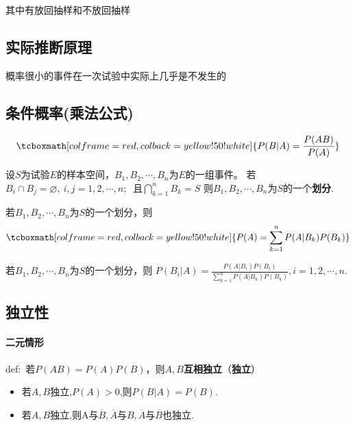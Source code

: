 \documentclass[UTF8]{ctexart}
\newcommand\stressbox{\tcboxmath[colframe=red,colback=yellow!50!white]}
\newenvironment{itemizeg}{\begin{itemize}}{\end{itemize}}
\begin{document}
其中有放回抽样和不放回抽样

\subsection{实际推断原理}

概率很小的事件在一次试验中实际上几乎是不发生的

\subsection{条件概率(乘法公式)}
$$\stressbox{\displaystyle P(B|A)=\frac{P(AB)}{P(A)}}$$

\begin{tcolorbox}[colframe=blue,title=\subsection{全概率公式}]
    \begin{tcolorbox}[colframe=white!60!black,title=\large 划分]
        设$S$为试验$E$的样本空间，$B_1,B_2,\cdots,B_n$为$E$的一组事件。
若$B_i\cap B_j=\varnothing,\ i,j=1,2,\cdots,n;\ $
且$\bigcap^n_{k=1}B_k=S$ 
则$B_1,B_2,\cdots,B_n$为$S$的一个\songti\textbf{划分}.
    \end{tcolorbox}
    \noindent 若$B_1,B_2,\cdots,B_n为S$的一个划分，则
    $$\stressbox{P(A)=\sum^n_{k=1}P(A|B_k)P(B_k)}$$
\begin{tcolorbox}[colframe=white!60!black,title=\large 贝叶斯(Bayes)公式]
    若$B_1,B_2,\cdots,B_n$为$S$的一个划分，则
$P(B_i|A)=\frac{P(A|B_i)P(B_i)}{\sum^n_{k=1}P(A|B_k)P(B_k)},i=1,2,\cdots,n.$
\end{tcolorbox}
\end{tcolorbox}

\subsection{独立性}

\paragraph{二元情形}
def:\ 若$P(AB)=P(A)P(B)$，则$A,B$\songti\textbf{互相独立}（\songti\textbf{独立}）
\begin{itemizeg}
    \item 若$A,B$独立,$P(A)>0$,则$P(B|A)=P(B).$
    \item 若$A,B$独立,则A与$\overline B,\overline A$与$B,\overline A$与$\overline B$也独立.
\end{itemizeg}
\end{document}

